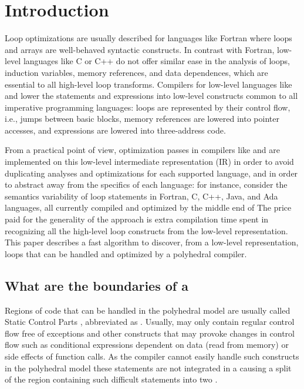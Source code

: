 \documentclass{sig-alternate}
\begin{document}
\section{Introduction}

Loop optimizations are usually described for languages like Fortran where loops
and arrays are well-behaved syntactic constructs.  In contrast with Fortran,
low-level languages like C or C++ do not offer similar ease in the analysis of
loops, induction variables, memory references, and data dependences, which are
essential to all high-level loop transforms.  Compilers for low-level languages
like \GCC{} and \LLVM{} lower the statements and expressions into low-level constructs
common to all imperative programming languages: loops are represented by their
control flow, i.e., jumps between basic blocks, memory references are lowered
into pointer accesses, and expressions are lowered into three-address code.

From a practical point of view, optimization passes in compilers like \GCC{} and
\LLVM{} are implemented on this low-level intermediate representation (IR) in order
to avoid duplicating analyses and optimizations for each supported language, and
in order to abstract away from the specifics of each language: for instance,
consider the semantics variability of loop statements in Fortran, C, C++, Java,
and Ada languages, all currently compiled and optimized by the middle end of
  The price paid for the generality of the approach is extra compilation
time spent in recognizing all the high-level loop constructs from the low-level
representation.  This paper describes a fast algorithm to discover, from a
low-level representation, loops that can be handled and optimized by a
polyhedral compiler.

\subsection{What are the boundaries of a }

Regions of code that can be handled in the polyhedral model are usually called
Static Control Parts \cite{Girbal,Bondhugula}, abbreviated as .  Usually,
 may only contain regular control flow free of exceptions and other
constructs that may provoke changes in control flow such as conditional
expressions dependent on data (read from memory) or side effects of function
calls.  As the compiler cannot easily handle such constructs in the polyhedral
model these statements are not integrated in a \SCoP{,} causing a split of the
region containing such difficult statements into two .
\end{document}
